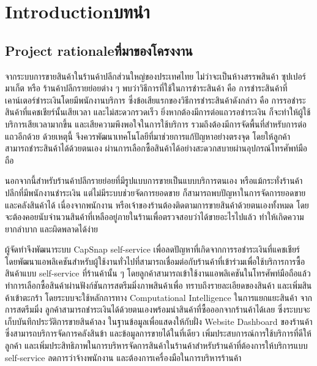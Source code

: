 \chapter{\ifenglish Introduction\else บทนำ\fi}

\section{\ifenglish Project rationale\else ที่มาของโครงงาน\fi}
\par จากระบบการขายสินค้าในร้านค้าปลีกส่วนใหญ่ของประเทศไทย ไม่ว่าจะเป็นห้างสรรพสินค้า ซุปเปอร์มาเก็ต หรือ
ร้านค้าปลีกรายย่อยต่าง ๆ พบว่าวิธีการที่ใช้ในการชำระสินค้า คือ การชำระสินค้าที่เคาน์เตอร์ชำระเงินโดยมีพนักงานบริการ 
ซึ่งข้อเสียแรกของวิธีการชำระสินค้าดังกล่าว คือ การรอชำระสินค้าที่แคชเชียร์นั้นเสียเวลา และไม่สะดวกรวดเร็ว 
ยิ่งหากต้องมีการต่อแถวรอชำระเงิน ก็จะทำให้ผู้ใช้บริการเสียเวลามากขึ้น และเสียความพึงพอใจในการใช้บริการ 
รวมถึงต้องมีการจัดพื้นที่สำหรับการต่อแถวอีกด้วย ด้วยเหตุนี้ จึงควรพัฒนาเทคโนโลยีที่มาช่วยการแก้ปัญหาอย่างตรงจุด 
โดยให้ลูกค้าสามารถชำระสินค้าได้ด้วยตนเอง ผ่านการเลือกซื้อสินค้าได้อย่างสะดวกสบายผ่านอุปกรณ์โทรศัพท์มือถือ 
 
 นอกจากนี้สำหรับร้านค้าปลีกรายย่อยที่มีรูปแบบการขายเป็นแบบบริการตนเอง หรือแม้กระทั่งร้านค้าปลีกที่มีพนักงานชำระเงิน
แต่ไม่มีระบบช่วยจัดการยอดขาย ก็สามารถพบปัญหาในการจัดการยอดขาย และคลังสินค้าได้ เนื่องจากพนักงาน
 หรือเจ้าของร้านต้องติดตามการขายสินค้าด้วยตนเองทั้งหมด โดยจะต้องคอยนับจํานวนสินค้าที่เหลืออยู่ภายในร้านเพื่อตรวจสอบว่าได้ขายอะไรไปแล้ว
  ทำให้เกิดความยากลำบาก และผิดพลาดได้ง่าย 
 
 ผู้จัดทําจึงพัฒนาระบบ CapSnap self-service เพื่อลดปัญหาที่เกิดจากการรอชำระเงินที่แคชเชียร์ 
โดยพัฒนาแอพลิเคชันสำหรับผู้ใช้งานทั่วไปที่สามารถเชื่อมต่อกับร้านค้าที่เข้าร่วมเพื่อใช้บริการการซื้อสินค้าแบบ self-service 
ที่ร้านค้านั้น ๆ โดยลูกค้าสามารถเข้าใช้งานแอพลิเคชันในโทรศัพท์มือถือแล้วทำการเลือกซื้อสินค้าผ่านฟังก์ชันการสตรีมมิ่งภาพสินค้าเพื่อ
ทราบถึงรายละเอียดของสินค้า และเพิ่มสินค้าเข้าตะกร้า โดยระบบจะใช้หลักการทาง Computational Intelligence ในการแยกแยะสินค้า
จากการสตรีมมิ่ง ลูกค้าสามารถชำระเงินได้ด้วยตนเองพร้อมนำสินค้าที่ซื้อออกจากร้านค้าได้เลย ซึ่งระบบจะเก็บบันทึกประวัติการขายสินค้าลง
ในฐานข้อมูลเพื่อแสดงให้กับฝั่ง Website Dashboard ของร้านค้าซึ่งสามารถบริการจัดการคลังสินข้า และข้อมูลการขายได้ในที่เดียว 
เพิ่มประสบการณ์การใช้บริการที่ดีให้ลูกค้า และเพิ่มประสิทธิภาพในการบริหารจัดการสินค้าในร้านค้าสำหรับร้านค้าที่ต้องการให้บริการแบบ
 self-service ลดการว่าจ้างพนักงาน และต้องการเครื่องมือในการบริหารร้านค้า 
 


